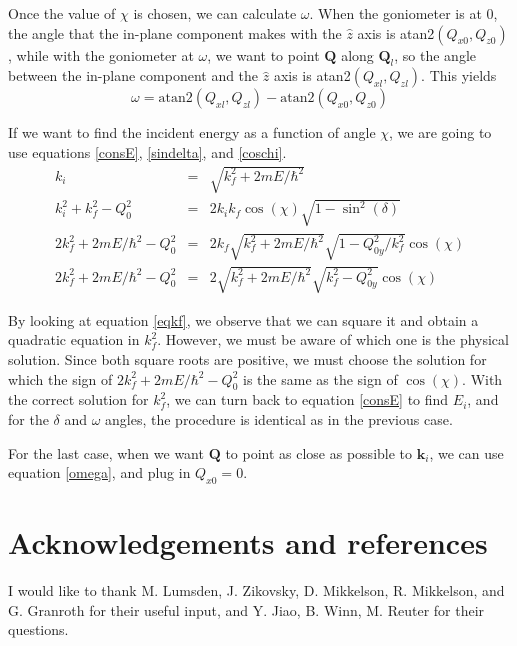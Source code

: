 \documentclass[prb]{revtex4}%
\begin{document}
Once the value of $\chi$ is chosen, we can calculate $\omega$. When the goniometer
is at 0, the angle that the in-plane component makes with the $\widehat{z}$ axis is
atan2$(Q_{x0},Q_{z0})$, while with the goniometer at $\omega$, we want to point $\textbf{Q}$ along
$\textbf{Q}_l$, so the angle between the in-plane component and the $\widehat{z}$ axis is
atan2$(Q_{xl},Q_{zl})$. This yields
\begin{equation}\label{omega}
    \omega = \text{atan2}(Q_{xl},Q_{zl}) - \text{atan2}(Q_{x0},Q_{z0})
\end{equation}

If we want to find the incident energy as a function of angle $\chi$, we are going to use
equations \ref{consE}, \ref{sindelta}, and \ref{coschi}.
\begin{eqnarray}
  k_i &=& \sqrt{k_f^2 + 2 m E/\hbar^2} \\
  k_i^2 + k_f^2 - Q_0^2 &=& 2 k_i k_f \cos(\chi) \sqrt{1-\sin^2(\delta)} \\
  2 k_f^2 + 2 m E/\hbar^2 - Q_0^2 &=& 2 k_f \sqrt{k_f^2 + 2 m E/\hbar^2} \sqrt{1-Q_{0y}^2/k_f^2} \cos(\chi) \\ 
  2 k_f^2 + 2 m E/\hbar^2 - Q_0^2 &=& 2 \sqrt{k_f^2 + 2 m E/\hbar^2} \sqrt{k_f^2-Q_{0y}^2} \cos(\chi) \label{eqkf}
\end{eqnarray}

By looking at equation \ref{eqkf}, we observe that we can square it and obtain a quadratic
equation in $k_f^2$. However, we must be aware of which one is the physical solution. Since both
square roots are positive, we must choose the solution for which the sign of $2 k_f^2 + 2 m E/\hbar^2 - Q_0^2$ is the same as the sign of $\cos(\chi)$. With the correct solution for $k_f^2$, we can turn back to 
equation \ref{consE} to find $E_i$, and for the $\delta$ and $\omega$ angles, the procedure is identical as in the previous case. 

For the last case, when we want $\textbf{Q}$ to point as close as possible to $\textbf{k}_i$, we can use
equation \ref{omega}, and plug in $Q_{x0}=0$.

\section{Acknowledgements and references}
I would like to thank M. Lumsden, J. Zikovsky, D. Mikkelson, R. Mikkelson, and G. Granroth for their useful input,
and Y. Jiao, B. Winn, M. Reuter for their questions.
\end{document}
